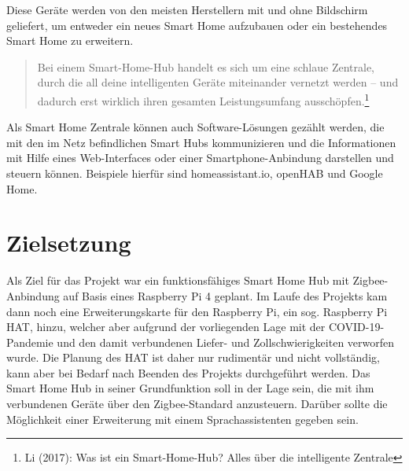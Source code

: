 \documentclass[12pt,a4paper]{article}
\begin{document}
 	Diese Geräte werden von den meisten Herstellern mit und ohne Bildschirm geliefert, um entweder ein neues Smart Home aufzubauen oder ein bestehendes Smart Home zu erweitern. 
 	\begin{quote}
 	\color{quotetext}
 		Bei einem Smart-Home-Hub handelt es sich um eine schlaue Zentrale, durch die all deine intelligenten Geräte miteinander vernetzt werden – und dadurch erst wirklich ihren gesamten Leistungsumfang ausschöpfen.\footnote{Li (2017): Was ist ein Smart-Home-Hub? Alles über die intelligente Zentrale}
 	\end{quote}
Als Smart Home Zentrale können auch Software-Lösungen gezählt werden, die mit den im Netz befindlichen Smart Hubs kommunizieren und die Informationen mit Hilfe eines Web-Interfaces oder einer Smartphone-Anbindung darstellen und steuern können. Beispiele hierfür sind homeassistant.io, openHAB und Google Home.\par
 	\newpage
	\section{Zielsetzung}
	Als Ziel für das Projekt war ein funktionsfähiges Smart Home Hub mit Zigbee-Anbindung auf Basis eines Raspberry Pi 4 geplant. Im Laufe des Projekts kam dann noch eine Erweiterungskarte für den Raspberry Pi, ein sog. Raspberry Pi HAT, hinzu, welcher aber aufgrund der vorliegenden Lage mit der COVID-19-Pandemie und den damit verbundenen Liefer- und Zollschwierigkeiten verworfen wurde. Die Planung des HAT ist daher nur rudimentär und nicht vollständig, kann aber bei Bedarf nach Beenden des Projekts durchgeführt werden. Das Smart Home Hub in seiner Grundfunktion soll in der Lage sein, die mit ihm verbundenen Geräte über den Zigbee-Standard anzusteuern. Darüber sollte die Möglichkeit einer Erweiterung mit einem Sprachassistenten gegeben sein.\par
\end{document}
